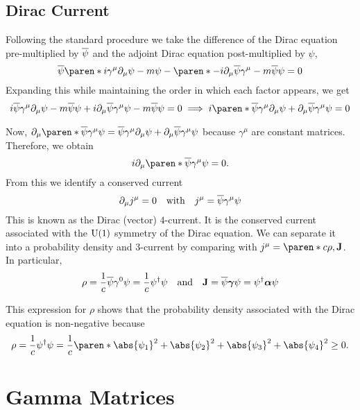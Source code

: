 \documentclass[11pt]{penrose}
\def\apsi{\qbar{\psi}}
\begin{document}
\subsection{Dirac Current}
Following the standard procedure we take the difference of the Dirac equation pre-multiplied by $\apsi$ and the adjoint Dirac equation post-multiplied by $\psi$,
\begin{equation}
    \apsi \paren*{ i\gamma^\mu \pd_\mu \psi - m \psi} - \paren*{-i \pd_\mu \apsi \gamma^\mu - m \apsi} \psi = 0
\end{equation}
Expanding this while maintaining the order in which each factor appears, we get
\begin{equation}
    i \apsi \gamma^\mu \pd_\mu \psi - m \apsi \psi + i \pd_\mu \apsi \gamma^\mu \psi - m \apsi \psi = 0
    \implies
    i \paren*{ \apsi \gamma^\mu \pd_\mu \psi + \pd_\mu \apsi \gamma^\mu \psi } = 0
\end{equation}

Now, $\pd_\mu \paren*{ \apsi \gamma^\mu \psi } = \apsi \gamma^\mu \pd_\mu \psi + \pd_\mu \apsi \gamma^\mu \psi$ because $\gamma^\mu$ are constant matrices. Therefore, we obtain
\begin{equation}
    i \pd_\mu \paren*{ \apsi \gamma^\mu \psi } = 0.
\end{equation}
From this we identify a conserved current
\begin{equation}
    \pd_\mu j^\mu = 0
    \quad\text{with}\quad
    j^\mu = \apsi \gamma^\mu \psi
\end{equation}
This is known as the Dirac (vector) $4$-current. It is the conserved current associated with the $\mathrm{U}(1)$ symmetry of the Dirac equation. We can separate it into a probability density and $3$-current by comparing with $j^\mu = \paren*{c\rho, \vec{J}}$. In particular,
\begin{equation}
    \rho = \frac{1}{c} \apsi \gamma^0 \psi = \frac{1}{c} \psi^\dagger \psi
    \quad\text{and}\quad
    \vec{J} = \apsi \vec{\gamma} \psi = \psi^\dagger \vec{\alpha} \psi
\end{equation}

This expression for $\rho$ shows that the probability density associated with the Dirac equation is non-negative because
\begin{equation}
    \rho = \frac{1}{c} \psi^\dagger \psi = \frac{1}{c} \paren*{ \abs{\psi_1}^2 + \abs{\psi_2}^2 + \abs{\psi_3}^2 + \abs{\psi_4}^2 } \geq 0.
\end{equation}

\section{Gamma Matrices}
\end{document}
